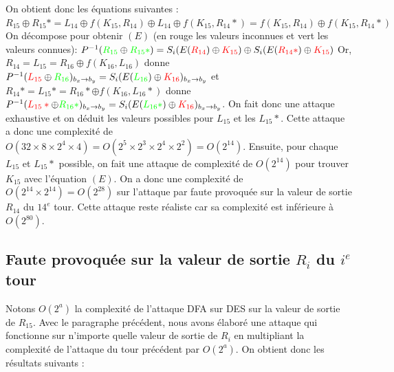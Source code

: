 \documentclass[11pt]{article}
\begin{document}
On obtient donc les équations suivantes : \newline
$R_{15} \oplus R_{15}* = L_{14} \oplus f(K_{15}, R_{14}) \oplus L_{14} \oplus f(K_{15}, R_{14}*)= f(K_{15}, R_{14}) \oplus f(K_{15}, R_{14}*)$ \newline \newline
On décompose pour obtenir $(E)$ (en rouge les valeurs inconnues et vert les valeurs connues): \newline
$P^{-1}(\color{green}R_{15}\color{black}\oplus\color{green}R_{15}*\color{black})=S_{i}(E(\color{red}R_{14}\color{black})\oplus \color{red}K_{15}\color{black})\oplus S_{i}(E(\color{red}R_{14}*\color{black})\oplus \color{red}K_{15}\color{black})$ \newline \newline
Or, $R_{14}=L_{15}=R_{16} \oplus f(K_{16}, L_{16})$ donne $P^{-1}(\color{red}L_{15}\color{black} \oplus \color{green}R_{16}\color{black})_{b_{x}\to b_{y}}=S_i(E(\color{green}L_{16}\color{black}) \oplus \color{red}K_{16}\color{black})_{b_{x}\to b_{y}}$ et \newline
$R_{14}*=L_{15}*=R_{16}* \oplus f(K_{16}, L_{16}*)$ donne $P^{-1}(\color{red}L_{15}*\color{black} \oplus \color{green}R_{16}*\color{black})_{b_{x}\to b_{y}}=S_i(E(\color{green}L_{16}*\color{black}) \oplus \color{red}K_{16}\color{black})_{b_{x}\to b_{y}}$. \newline 
On fait donc une attaque exhaustive et on déduit les valeurs possibles pour $L_{15}$ et les $L_{15}*$. Cette attaque a donc une complexité de $O(32 \times 8 \times 2^4 \times 4)=O(2^5 \times 2^3 \times 2^4 \times 2^2)=O(2^{14})$. \newline \newline
Ensuite, pour chaque $L_{15}$ et $L_{15}*$ possible, on fait une attaque de complexité de $O(2^{14})$ pour trouver $K_{15}$ avec l'équation $(E)$. \newline
On a donc une complexité de $O(2^{14} \times 2^{14})=O(2^{28})$ sur l'attaque par faute provoquée sur la valeur de sortie $R_{14}$ du $14^{e}$ tour. Cette attaque reste réaliste car sa complexité est inférieure à $O(2^{80})$.

\subsection{Faute provoquée sur la valeur de sortie $R_{i}$ du $i^{e}$ tour}

Notons $O(2^a)$ la complexité de l'attaque DFA sur DES sur la valeur de sortie de $R_{15}$. Avec le paragraphe précédent, nous avons élaboré une attaque qui fonctionne sur n'importe quelle valeur de sortie de $R_i$ en multipliant la complexité de l'attaque du tour précédent par $O(2^a)$. On obtient donc les résultats suivants : 
\end{document}
